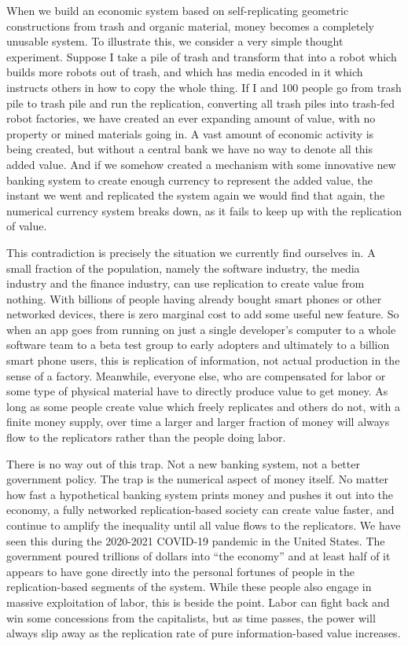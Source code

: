 \documentclass[12pt,a4paper]{amsart}
\numberwithin{equation}{section}
\begin{document}
When we build an economic system based on self-replicating geometric
constructions from trash and organic material, money becomes a
completely unusable system. To illustrate this, we consider a very
simple thought experiment. Suppose I take a pile of trash and transform
that into a robot which builds more robots out of trash, and which has
media encoded in it which instructs others in how to copy the whole
thing. If I and 100 people go from trash pile to trash pile and run the
replication, converting all trash piles into trash-fed robot factories,
we have created an ever expanding amount of value, with no property or
mined materials going in. A vast amount of economic activity is being
created, but without a central bank we have no way to denote all this
added value. And if we somehow created a mechanism with some innovative
new banking system to create enough currency to represent the added
value, the instant we went and replicated the system again we would find
that again, the numerical currency system breaks down, as it fails to
keep up with the replication of value.

This contradiction is precisely the situation we currently find
ourselves in. A small fraction of the population, namely the software
industry, the media industry and the finance industry, can use
replication to create value from nothing. With billions of people having
already bought smart phones or other networked devices, there is zero
marginal cost to add some useful new feature. So when an app goes from
running on just a single developer's computer to a whole software team
to a beta test group to early adopters and ultimately to a billion smart
phone users, this is replication of information, not actual production
in the sense of a factory. Meanwhile, everyone else, who are compensated
for labor or some type of physical material have to directly produce
value to get money. As long as some people create value which freely
replicates and others do not, with a finite money supply, over time a
larger and larger fraction of money will always flow to the replicators
rather than the people doing labor.

There is no way out of this trap. Not a new banking system, not a better
government policy. The trap is the numerical aspect of money itself. No
matter how fast a hypothetical banking system prints money and pushes it
out into the economy, a fully networked replication-based society can
create value faster, and continue to amplify the inequality until all
value flows to the replicators. We have seen this during the 2020-2021
COVID-19 pandemic in the United States. The government poured trillions
of dollars into ``the economy'' and at least half of it appears to have
gone directly into the personal fortunes of people in the
replication-based segments of the system. While these people also engage
in massive exploitation of labor, this is beside the point. Labor can
fight back and win some concessions from the capitalists, but as time
passes, the power will always slip away as the replication rate of pure
information-based value increases.
\end{document}

